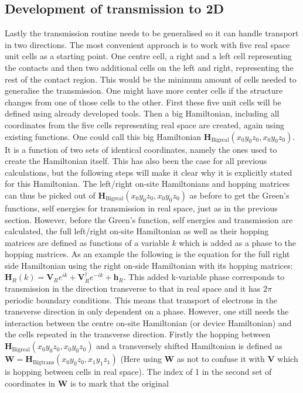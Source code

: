 \vspace{-1\baselineskip}
\vspace{\baselineskip}
\subsection{Development of transmission to 2D}\label{trans2d}
Lastly the transmission routine needs to be generalised so it can handle transport in two directions. The most convenient approach is to work with five real space unit cells as a starting point. One centre cell, a right and a left cell representing the contacts and then two additional cells on the left and right, representing the rest of the contact region. This would be the minimum amount of cells needed to generalise the transmission. One might have more center cells if the structure changes from one of those cells to the other. First these five unit cells will be defined using already developed tools. Then a big Hamiltonian, including all coordinates from the five cells representing real space are created, again using existing functions. One could call this big Hamiltonian \(\textbf{H}_{\text{Bigreal}}(x_0y_0z_0,x_0y_0z_0)\). It is a function of two sets of identical coordinates, namely the ones used to create the Hamiltonian itself. This has also been the case for all previous calculations, but the following steps will make it clear why it is explicitly stated for this Hamiltonian. The left/right on-site Hamiltonians and hopping matrices can thus be picked out of \(\textbf{H}_{\text{Bigreal}}(x_0y_0z_0,x_0y_0z_0)\) as before to get the Green's functions, self energies for transmission in real space, just as in the previous section. However, before the Green's function, self energies and transmission are calculated, the full left/right on-site Hamiltonian as well as their hopping matrices are defined as functions of a variable \(k\) which is added as a phase to the hopping matrices. As an example the following is the equation for the full right side Hamiltonian using the right on-side Hamiltonian with its hopping matrices: \(\textbf{H}_R(k) = \textbf{V}_Re^{ik}+\textbf{V}^{\dagger}_Re^{-ik}+\textbf{h}_R\). This added k-variable phase corresponds to transmission in the direction transverse to that in real space and it has \(2\pi\) periodic boundary conditions. This means that transport of electrons in the transverse direction in only dependent on a phase. However, one still needs the interaction between the centre on-site Hamiltonian (or device Hamiltonian) and the cells repeated in the transverse direction. Firstly the hopping between \(\textbf{H}_{\text{Bigreal}}(x_0y_0z_0,x_0y_0z_0)\) and a transversely shifted Hamiltonian is defined as \(\textbf{W} = \textbf{H}_{\text{Bigtrans}}(x_0y_0z_0,x_1y_1z_1)\) (Here using \textbf{W} as not to confuse it with \textbf{V} which is hopping between cells in real space). The  index of 1 in the second set of coordinates in \(\mathbf{W}\) is to mark that the original 